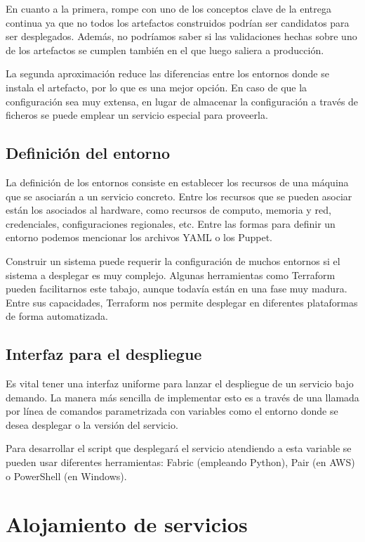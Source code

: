 \documentclass[11pt,a4paper]{article}
\begin{document}
En cuanto a la primera, rompe con uno de los conceptos clave de la entrega continua ya que no todos los artefactos construidos podrían ser candidatos para ser desplegados. Además, no podríamos saber si las validaciones hechas sobre uno de los artefactos se cumplen también en el que luego saliera a producción.

La segunda aproximación reduce las diferencias entre los entornos donde se instala el artefacto, por lo que es una mejor opción. En caso de que la configuración sea muy extensa, en lugar de almacenar la configuración a través de ficheros se puede emplear un servicio especial para proveerla.

\subsection{Definición del entorno}

La definición de los entornos consiste en establecer los recursos de una máquina que se asociarán a un servicio concreto. Entre los recursos que se pueden asociar están los asociados al hardware, como recursos de computo, memoria y red, credenciales, configuraciones regionales, etc. Entre las formas para definir un entorno podemos mencionar los archivos YAML o los Puppet. 

Construir un sistema puede requerir la configuración de muchos entornos si el sistema a desplegar es muy complejo. Algunas herramientas como Terraform pueden facilitarnos este tabajo, aunque todavía están en una fase muy madura. Entre sus capacidades, Terraform nos permite desplegar en diferentes plataformas de forma automatizada.

\subsection{Interfaz para el despliegue}

Es vital tener una interfaz uniforme para lanzar el despliegue de un servicio bajo demando. La manera más sencilla de implementar esto es a través de una llamada por línea de comandos parametrizada con variables como el entorno donde se desea desplegar o la versión del servicio.

Para desarrollar el script que desplegará el servicio atendiendo a esta variable se pueden usar diferentes herramientas: Fabric (empleando Python), Pair (en AWS) o PowerShell (en Windows).

\section{Alojamiento de servicios}
\end{document}
